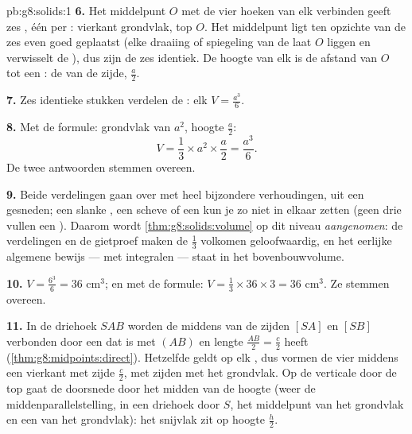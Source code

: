 \begin{solution}{pb:g8:solids:1}
\textbf{6.} Het middelpunt $O$ met de vier hoeken van elk  verbinden geeft
zes , één per : vierkant grondvlak, top $O$. Het middelpunt ligt
ten opzichte van de zes  even goed geplaatst (elke draaiing of
spiegeling van de  laat $O$ liggen en verwisselt de ), dus zijn de
zes  identiek. De hoogte van elk is de afstand van $O$ tot een :
de  van de zijde, $\frac{a}{2}$.

\textbf{7.} Zes identieke stukken verdelen de : elk $V = \frac{a^3}{6}$.

\textbf{8.} Met de formule: grondvlak van  $a^2$, hoogte $\frac a2$:
\[
V = \frac13 \times a^2 \times \frac{a}{2} = \frac{a^3}{6} .
\]
De twee antwoorden stemmen overeen.

\textbf{9.} Beide verdelingen gaan over  met heel bijzondere
verhoudingen, uit een  gesneden; een slanke , een scheve  of
een  kun je zo niet in elkaar zetten (geen drie  vullen een ).
Daarom wordt \cref{thm:g8:solids:volume} op dit niveau \emph{aangenomen}: de
verdelingen en de gietproef maken de $\frac13$ volkomen geloofwaardig, en het
eerlijke algemene bewijs --- met integralen --- staat in het bovenbouwvolume.

\textbf{10.} $V = \frac{6^3}{6} = 36$ cm$^3$; en met de formule:
$V = \frac13 \times 36 \times 3 = 36$ cm$^3$. Ze stemmen overeen.

\textbf{11.} In de driehoek $SAB$ worden de middens van de zijden $[SA]$ en
$[SB]$ verbonden door een  dat  is met $(AB)$ en lengte
$\frac{AB}{2} = \frac{c}{2}$ heeft (\cref{thm:g8:midpoints:direct}). Hetzelfde
geldt op elk , dus vormen de vier middens een vierkant met zijde
$\frac c2$, met zijden  met het grondvlak. Op de verticale  door de
top gaat de doorsnede door het midden van de hoogte (weer de
middenparallelstelling, in een driehoek door $S$, het middelpunt van het
grondvlak en een  van het grondvlak): het snijvlak zit op hoogte
$\frac h2$.


\end{solution}

